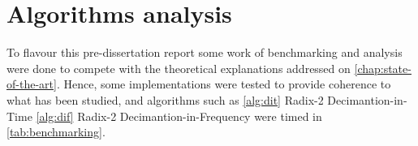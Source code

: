 \documentclass[
  oneside,
  11pt, a4paper,
  footinclude=true,
  headinclude=true,
  cleardoublepage=empty
]{scrbook}
\begin{document}





\chapter{Algorithms analysis}


To flavour this pre-dissertation report some work of benchmarking and analysis were done to compete with the theoretical explanations addressed on \autoref{chap:state-of-the-art}. Hence, some implementations were tested to provide coherence to what has been studied, and algorithms such as \autoref{alg:dit} Radix-2 Decimantion-in-Time \autoref{alg:dif} Radix-2 Decimantion-in-Frequency were timed in \autoref{tab:benchmarking}.
\end{document}
